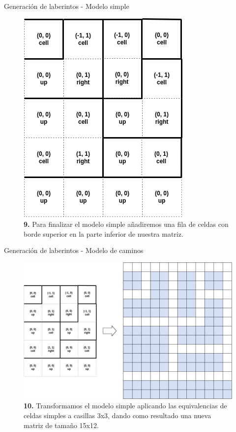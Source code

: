 \documentclass{beamer}
\begin{document}
    \begin{frame}{Generación de laberintos - Modelo simple \scriptsize{\hfill \secname}}
        \begin{figure}[H]
        \centering
            \includegraphics[scale=0.375]{img/paso9.png}
            \caption{\textbf{9.} Para finalizar el modelo simple añadiremos una fila de celdas con borde superior en la parte inferior de nuestra matriz.}
        \end{figure}
    \end{frame}
    
    \begin{frame}{Generación de laberintos - Modelo de caminos \scriptsize{\hfill \secname}}
        \begin{figure}[H]
        \centering
        \includegraphics[scale=0.275]{img/paso10.png}
        \caption{\textbf{10.} Transformamos el modelo simple aplicando las equivalencias de celdas simples a casillas 3x3, dando como resultado una nueva matriz de tamaño 15x12.}
        \end{figure}
    \end{frame}
    
\end{document}
